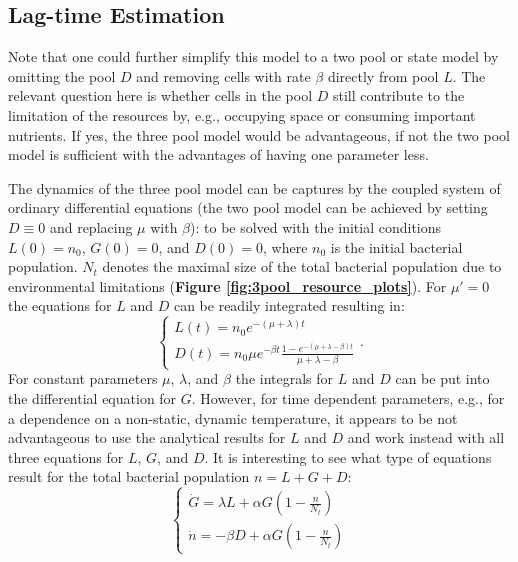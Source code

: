 \documentclass[10pt,A4paper]{article}
\begin{document}
\subsection{Lag-time Estimation}

Note that one could further simplify this model to a two pool or state model by omitting the pool $D$ and removing cells with rate $\beta$ directly from pool $L$. 
The relevant question here is whether cells in the pool $D$ still contribute to the limitation of the resources by, e.g., occupying space or consuming important nutrients. 
If yes, the three pool model would be advantageous, if not the two pool model is sufficient with the advantages of having one parameter less.

The dynamics of the three pool model can be captures by the coupled system of ordinary differential equations (the two pool model can be achieved by setting $D\equiv 0$ and replacing $\mu$ with $\beta$):
to be solved with the initial conditions $L(0)=n_0$, $G(0)=0$, and $D(0)=0$, where $n_0$ is the initial bacterial population. 
$N_t$ denotes the maximal size of the total bacterial population due to environmental limitations (\textbf{Figure \ref{fig:3pool_resource_plots}}). 
For $\mu'=0$ the equations for $L$ and $D$ can be readily integrated resulting in:
\begin{equation}
    \begin{cases}
        L(t) = n_0 e^{-(\mu+\lambda)t}\\
        D(t) = n_0 \mu e^{-\beta t}\frac{1-e^{-(\mu+\lambda-\beta)t}}{\mu+\lambda-\beta}
    \end{cases}.
\end{equation}
For constant parameters $\mu$, $\lambda$, and $\beta$ the integrals for $L$ and $D$ can be put into the differential equation for $G$. 
However, for time dependent parameters, e.g., for a dependence on a non-static, dynamic temperature, it appears to be not advantageous to use the analytical results for $L$ and $D$ and work instead with all three equations for $L$, $G$, and $D$. 
It is interesting to see what type of equations result for the total bacterial population $n=L+G+D$:
\begin{equation}
    \begin{cases}
        \dot{G} = \lambda L + \alpha G\left(1-\frac{n}{N_t}\right)\\
        \dot{n} = - \beta D + \alpha G\left(1-\frac{n}{N_t}\right)
    \end{cases}
\end{equation}
\end{document}
